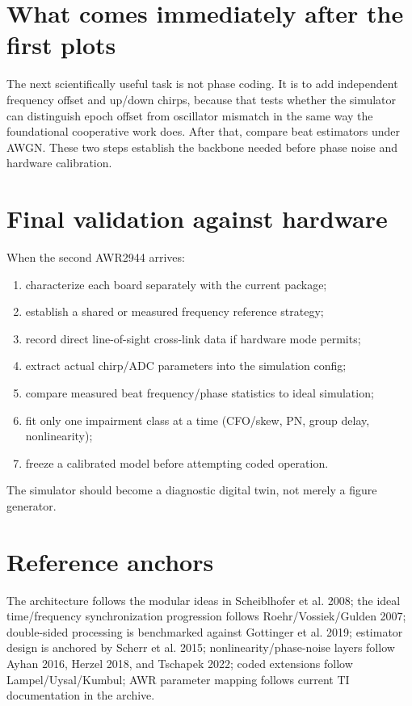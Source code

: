 \documentclass[11pt]{article}
\begin{document}
\section{What comes immediately after the first plots}
The next scientifically useful task is not phase coding. It is to add independent frequency offset and up/down chirps, because that tests whether the simulator can distinguish epoch offset from oscillator mismatch in the same way the foundational cooperative work does. After that, compare beat estimators under AWGN. These two steps establish the backbone needed before phase noise and hardware calibration.

\section{Final validation against hardware}
When the second AWR2944 arrives:
\begin{enumerate}
\item characterize each board separately with the current package;
\item establish a shared or measured frequency reference strategy;
\item record direct line-of-sight cross-link data if hardware mode permits;
\item extract actual chirp/ADC parameters into the simulation config;
\item compare measured beat frequency/phase statistics to ideal simulation;
\item fit only one impairment class at a time (CFO/skew, PN, group delay, nonlinearity);
\item freeze a calibrated model before attempting coded operation.
\end{enumerate}
The simulator should become a diagnostic digital twin, not merely a figure generator.

\section{Reference anchors}
The architecture follows the modular ideas in Scheiblhofer et al. 2008; the ideal time/frequency synchronization progression follows Roehr/Vossiek/Gulden 2007; double-sided processing is benchmarked against Gottinger et al. 2019; estimator design is anchored by Scherr et al. 2015; nonlinearity/phase-noise layers follow Ayhan 2016, Herzel 2018, and Tschapek 2022; coded extensions follow Lampel/Uysal/Kumbul; AWR parameter mapping follows current TI documentation in the archive.
\end{document}
